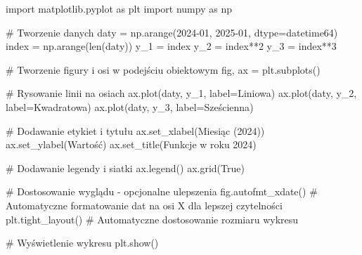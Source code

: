 \documentclass[
  polish,
  letterpaper,
  DIV=11,
  numbers=noendperiod]{scrreprt}
\newenvironment{Shaded}{\begin{snugshade}}{\end{snugshade}}
\newcommand{\BuiltInTok}[1]{\textcolor[rgb]{0.00,0.23,0.31}{#1}}
\newcommand{\CommentTok}[1]{\textcolor[rgb]{0.37,0.37,0.37}{#1}}
\newcommand{\DecValTok}[1]{\textcolor[rgb]{0.68,0.00,0.00}{#1}}
\newcommand{\ImportTok}[1]{\textcolor[rgb]{0.00,0.46,0.62}{#1}}
\newcommand{\NormalTok}[1]{\textcolor[rgb]{0.00,0.23,0.31}{#1}}
\newcommand{\OperatorTok}[1]{\textcolor[rgb]{0.37,0.37,0.37}{#1}}
\newcommand{\StringTok}[1]{\textcolor[rgb]{0.13,0.47,0.30}{#1}}
\newcommand{\VariableTok}[1]{\textcolor[rgb]{0.07,0.07,0.07}{#1}}
\begin{document}
\begin{Shaded}
\begin{Highlighting}[]
\ImportTok{import}\NormalTok{ matplotlib.pyplot }\ImportTok{as}\NormalTok{ plt}
\ImportTok{import}\NormalTok{ numpy }\ImportTok{as}\NormalTok{ np}

\CommentTok{\# Tworzenie danych}
\NormalTok{daty }\OperatorTok{=}\NormalTok{ np.arange(}\StringTok{\textquotesingle{}2024{-}01\textquotesingle{}}\NormalTok{, }\StringTok{\textquotesingle{}2025{-}01\textquotesingle{}}\NormalTok{, dtype}\OperatorTok{=}\StringTok{\textquotesingle{}datetime64\textquotesingle{}}\NormalTok{)}
\NormalTok{index }\OperatorTok{=}\NormalTok{ np.arange(}\BuiltInTok{len}\NormalTok{(daty))}
\NormalTok{y\_1 }\OperatorTok{=}\NormalTok{ index}
\NormalTok{y\_2 }\OperatorTok{=}\NormalTok{ index}\OperatorTok{**}\DecValTok{2}
\NormalTok{y\_3 }\OperatorTok{=}\NormalTok{ index}\OperatorTok{**}\DecValTok{3}

\CommentTok{\# Tworzenie figury i osi w podejściu obiektowym}
\NormalTok{fig, ax }\OperatorTok{=}\NormalTok{ plt.subplots()}

\CommentTok{\# Rysowanie linii na osiach}
\NormalTok{ax.plot(daty, y\_1, label}\OperatorTok{=}\StringTok{\textquotesingle{}Liniowa\textquotesingle{}}\NormalTok{)}
\NormalTok{ax.plot(daty, y\_2, label}\OperatorTok{=}\StringTok{\textquotesingle{}Kwadratowa\textquotesingle{}}\NormalTok{)}
\NormalTok{ax.plot(daty, y\_3, label}\OperatorTok{=}\StringTok{\textquotesingle{}Sześcienna\textquotesingle{}}\NormalTok{)}

\CommentTok{\# Dodawanie etykiet i tytułu}
\NormalTok{ax.set\_xlabel(}\StringTok{\textquotesingle{}Miesiąc (2024)\textquotesingle{}}\NormalTok{)}
\NormalTok{ax.set\_ylabel(}\StringTok{\textquotesingle{}Wartość\textquotesingle{}}\NormalTok{)}
\NormalTok{ax.set\_title(}\StringTok{\textquotesingle{}Funkcje w roku 2024\textquotesingle{}}\NormalTok{)}

\CommentTok{\# Dodawanie legendy i siatki}
\NormalTok{ax.legend()}
\NormalTok{ax.grid(}\VariableTok{True}\NormalTok{)}

\CommentTok{\# Dostosowanie wyglądu {-} opcjonalne ulepszenia}
\NormalTok{fig.autofmt\_xdate()  }\CommentTok{\# Automatyczne formatowanie dat na osi X dla lepszej czytelności}
\NormalTok{plt.tight\_layout()   }\CommentTok{\# Automatyczne dostosowanie rozmiaru wykresu}

\CommentTok{\# Wyświetlenie wykresu}
\NormalTok{plt.show()}
\end{Highlighting}
\end{Shaded}
\end{document}
